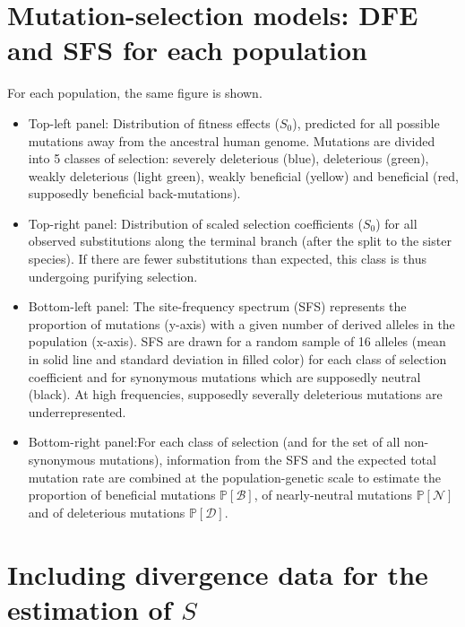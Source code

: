 \documentclass[12pt]{article}
\newcommand{\proba}{\mathbb{P}}
\newcommand{\Sphy}{S_{0}}
\newcommand{\Spop}{S}
\newcommand{\SpopDel}{\mathcal{D}}
\newcommand{\SpopNeu}{\mathcal{N}}
\newcommand{\SpopBen}{\mathcal{B}}
\newcommand{\ProbaPopDel}{\proba [ \SpopDel]}
\newcommand{\ProbaPopNeu}{\proba [ \SpopNeu ]}
\newcommand{\ProbaPopBen}{\proba [ \SpopBen ]}
\begin{document}
    \section{Mutation-selection models: DFE and SFS for each population}\label{sec:mutation-selection-models:-histograms-and-sfs-for-each-population}
    For each population, the same figure is shown.
    \begin{itemize}
        \item Top-left panel: Distribution of fitness effects ($\Sphy$), predicted for all possible mutations away from the ancestral human genome.
        Mutations are divided into 5 classes of selection: severely deleterious (blue), deleterious (green), weakly deleterious (light green), weakly beneficial (yellow) and beneficial (red, supposedly beneficial back-mutations).
        \item Top-right panel: Distribution of scaled selection coefficients ($\Sphy$) for all observed substitutions along the terminal branch (after the split to the sister species).
        If there are fewer substitutions than expected, this class is thus undergoing purifying selection.
        \item Bottom-left panel: The site-frequency spectrum (SFS) represents the proportion of mutations (y-axis) with a given number of derived alleles in the population (x-axis).
        SFS are drawn for a random sample of 16 alleles (mean in solid line and standard deviation in filled color) for each class of selection coefficient and for synonymous mutations which are supposedly neutral (black).
        At high frequencies, supposedly severally deleterious mutations are underrepresented.
        \item Bottom-right panel:For each class of selection (and for the set of all non-synonymous mutations), information from the SFS and the expected total mutation rate are combined at the population-genetic scale to estimate the proportion of beneficial mutations $\ProbaPopBen$, of nearly-neutral mutations $\ProbaPopNeu$ and of deleterious mutations $\ProbaPopDel$.
    \end{itemize}

    
    \newpage


    \section{Including divergence data for the estimation of $\Spop$}
\end{document}
